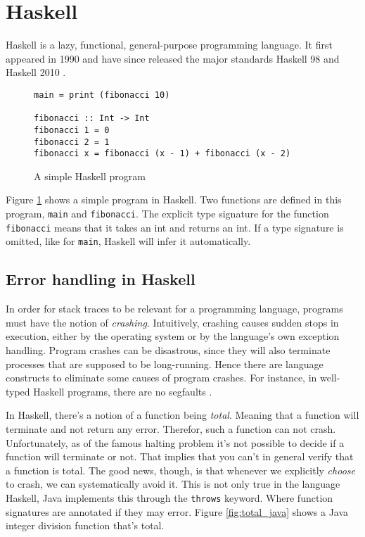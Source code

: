 \section{Haskell}

Haskell is a lazy, functional, general-purpose programming language.
\cite{haskell_report2010}
It first appeared in 1990 \cite{HistoryOfHaskell2007}  and have since
released the major standards Haskell 98 and Haskell 2010
\cite{haskell_report2010}.

\begin{figure}
\begin{mdframed}
  \begin{verbatim}
main = print (fibonacci 10)

fibonacci :: Int -> Int
fibonacci 1 = 0
fibonacci 2 = 1
fibonacci x = fibonacci (x - 1) + fibonacci (x - 2)
  \end{verbatim}
  \caption{A simple Haskell program}
  \label{fig:simple_program}
\end{mdframed}
\end{figure}

Figure \ref{fig:simple_program} shows a simple program in Haskell.
Two functions are defined in this program, \texttt{main} and
\texttt{fibonacci}.  The explicit type signature for the function
\texttt{fibonacci} means that it takes an int and returns an int. If a type
signature is omitted, like for \texttt{main}, Haskell will infer it automatically.

\subsection{Error handling in Haskell}

In order for stack traces to be relevant for a programming language, programs
must have the notion of \emph{crashing}. Intuitively, crashing causes sudden
stops in execution, either by the operating system or by the language's own
exception handling. Program crashes can be disastrous, since they will also
terminate processes that are supposed to be long-running. Hence there are
language constructs to eliminate some causes of program crashes.
For instance,
in well-typed Haskell programs, there are no segfaults \cite{FindingTheNeedle2009}.

In Haskell, there's a notion of a function being \emph{total}. Meaning
that a function will terminate and not return any error. Therefor,
such a function can not crash. Unfortunately, as of the famous halting
problem it's not possible to decide if a function will terminate or not.
That implies that you can't in general
verify that a function is total. \cite[p.380]{Hopcroft:2000}
The good news, though, is that whenever we
explicitly \emph{choose} to crash, we can systematically avoid it. This is not
only true in the language Haskell, Java implements this through the
\texttt{throws} keyword. \cite{oracle_java_doc_method_throws} Where
function signatures are annotated if they may error.
Figure \ref{fig:total_java} shows a Java integer division function that's
total.

